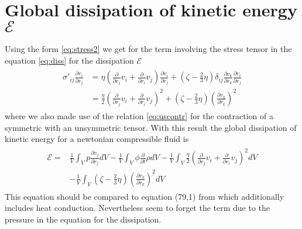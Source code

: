 \documentclass[a4paper,
					12pt,
					twoside,
					pagesize,
					cleardoubleplain,
					headsepline,
					bibtotoc
					]{scrbook}
\newcommand{\lra}[1]{{ \left( #1 \right) }}
\newcommand{\pd}[1]{\frac{\partial}{\partial #1}}
\newcommand{\ppd}[2]{\frac{\partial #2}{\partial #1}}
\begin{document}
\section{Global dissipation of kinetic energy $\mathcal{E}$}
Using the form \eqref{eq:stress2} we get for the term involving the stress
tensor in the equation \eqref{eq:diss} for the dissipation $\mathcal{E}$
\begin{align}
\begin{split}
\sigma'_{ij}\ppd{r_j}{v_i} 
&= \eta\lra{\pd{r_j}v_i+\pd{r_i}v_j}\ppd{r_j}{v_i}
+ \lra{\zeta-\frac{2}{3}\eta}\delta_{ij}\ppd{r_k}{v_k}\ppd{r_j}{v_i}\\
&=\frac{\eta}{2}\lra{\pd{r_j}v_i+\pd{r_i}v_j}^2
+\lra{\zeta-\frac{2}{3}\eta}\lra{\ppd{r_k}{v_k}}^2
\end{split}
\end{align}
where we also made use of the relation \eqref{eq:uscontr} for the contraction of
a symmetric with an unsymmetric tensor. With this result the global dissipation
of kinetic energy for a newtonian compressible fluid is
\begin{align}
\begin{split}
\mathcal{E} =& 
\frac{1}{V} \int_V p \ppd{r_j}{v_j} dV
-\frac{1}{V} \int_V \phi \pd{t}\rho dV
-\frac{1}{V} \int_V \frac{\eta}{2}\lra{\pd{r_j}v_i+\pd{r_i}v_j}^2 dV\\
&-\frac{1}{V} \int_V \lra{\zeta-\frac{2}{3}\eta}\lra{\ppd{r_k}{v_k}}^2 dV
\end{split}
\end{align}
This equation should be compared to equation (79,1) from \citet{Landau1991}
which additionally includes heat conduction. Nevertheless \citet{Landau1991}
seem to forget the term due to the pressure in the equation for the
dissipation.
\end{document}
